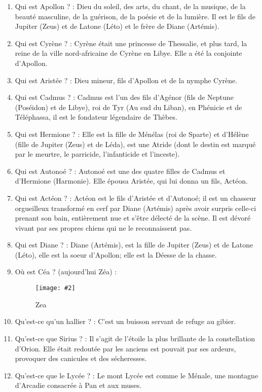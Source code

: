 \documentclass[a4paper, 11pt, hidelinks]{article}
\newcommand{\bs}{\bigskip}
\newcommand{\img}[4]{\begin{figure}[!ht]
    \centering
    \texttt{[image: \#2]}
    \caption{#3}
    \label{#4}
    \end{figure} }
\begin{document}
\begin{enumerate}
            \bs \bs
      \item Qui est Apollon ? : Dieu du soleil, des arts, du chant, de la musique, de la beauté masculine, de la guérison, de la
            poésie et de la lumière. Il est le fils de Jupiter (Zeus) et de Latone (Léto) et le frère de Diane (Artémis).
      \item Qui est Cyrène ? : Cyrène était une princesse de Thessalie, et plus tard, la reine de la ville nord-africaine de Cyrène en Libye.
            Elle a été la conjointe d'Apollon.
      \item Qui est Aristée ? : Dieu mineur, fils d'Apollon et de la nymphe Cyrène. \bs \bs
      \item Qui est Cadmus ? : Cadmus est l'un des fils d'Agénor (fils de Neptune (Poséidon) et de Libye), roi de Tyr (Au sud du Liban), en
            Phénicie et de Téléphassa, il est le fondateur légendaire de Thèbes.
      \item Qui est Hermione ? : Elle est la fille de Ménélas (roi de Sparte) et d'Hélène (fille de Jupiter (Zeus) et de Léda), est une Atride (dont le destin est marqué
            par le meurtre, le parricide, l'infanticide et l'inceste).
      \item Qui est Autonoé ? : Autonoé est une des quatre filles de Cadmus et d'Hermione (Harmonie).
            Elle épousa Aristée, qui lui donna un fils, Actéon.
      \item Qui est Actéon ? : Actéon est le fils d'Aristée et d'Autonoé; il est un chasseur orgueilleux transformé en cerf par Diane (Artémis) après avoir surpris celle-ci prenant son bain, entièrement nue et s'être délecté de la scène.
            Il est dévoré vivant par ses propres chiens qui ne le reconnaissent pas.\bs \bs
      \item Qui est Diane ? : Diane (Artémis), est la fille de Jupiter (Zeus) et de Latone (Léto), elle est la soeur d'Apollon; elle est la Déesse de la chasse.
      \item Où est Céa ? (aujourd'hui Zéa) : \img{0.5}{Zea.png}{Zea}{3}
            \newpage
      \item Qu'est-ce qu'un hallier ? : C'est un buisson servant de refuge au gibier.
      \item Qu'est-ce que Sirius ? : Il s'agit de l'étoile la plus brillante de la constellation d'Orion. Elle était redoutée par les
            anciens est pouvait par ses ardeurs, provoquer des canicules et des sécheresses.
      \item Qu'est-ce que le Lycée ? : Le mont Lycée est comme le Ménale, une montagne d'Arcadie consacrée à Pan et aux muses.

\end{enumerate}
\end{document}
